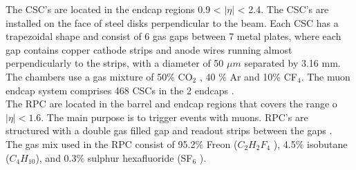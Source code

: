 The CSC's are located in the endcap regions 0.9 < $|\eta|$ < 2.4. The CSC's are installed on the face of steel disks perpendicular to the beam. 
Each CSC has a trapezoidal shape and consist of 6 gas gaps between 7 metal plates, where each gap contains  copper cathode strips and anode wires running almost perpendicularly to
the strips, with a diameter of 50 $\mu m$ separated by 3.16 mm.  
The chambers use a gas mixture of 50$\%$ CO$_2$ , 40 $\%$ Ar and 10$\%$ CF$_4$. The muon endcap system comprises 468 CSCs in the 2 endcaps \cite{cms-manual,cms7}.
\\

The RPC are located in the barrel and endcap regions that covers the range o $|\eta|<1.6$. The main purpose is to trigger events with muons. 
RPC's are structured with a double gas filled gap and readout strips between the gaps .\\
 The gas mix used in the RPC consist of 95.2$\%$ Freon
($C_2 H_2 F_4$ ), 4.5$\%$ isobutane ($C_4 H_{10}$), and 0.3$\%$ sulphur hexafluoride (SF$_6$ )\cite{cms7}.\\



